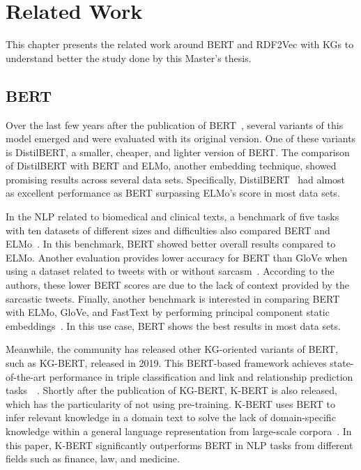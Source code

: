 
\chapter{Related Work}
\label{chap:related:work}

This chapter presents the related work around BERT and RDF2Vec with KGs to
understand better the study done by this Master's thesis.

\section{BERT}
\label{section:related:work:bert}

Over the last few years after the publication of
BERT~\citep{inproceedings:devlin}, several variants of this model emerged and
were evaluated with its original version. One of these variants is DistilBERT, a
smaller, cheaper, and lighter version of BERT. The comparison of DistilBERT with
BERT and ELMo, another embedding technique, showed promising results across
several data sets. Specifically, DistilBERT~\citep{distilbert} had almost as
excellent performance as BERT surpassing ELMo's score in most data sets.

In the NLP related to biomedical and clinical texts, a benchmark of five tasks
with ten datasets of different sizes and difficulties also compared BERT and
ELMo~\citep{peng}. In this benchmark, BERT showed better overall results
compared to ELMo. Another evaluation provides lower accuracy for BERT than GloVe
when using a dataset related to tweets with or without
sarcasm~\citep{khatri}. According to the authors, these lower BERT scores are
due to the lack of context provided by the sarcastic tweets. Finally, another
benchmark is interested in comparing BERT with ELMo, GloVe, and FastText by
performing principal component static embeddings~\citep{ethayarajh}. In this use
case, BERT shows the best results in most data sets.

Meanwhile, the community has released other KG-oriented variants of BERT, such
as KG-BERT, released in 2019. This BERT-based framework achieves
state-of-the-art performance in triple classification and link and relationship
prediction tasks~~\citep{DBLP:journals/corr/abs-1909-03193}. Shortly after the
publication of KG-BERT, K-BERT is also released, which has the particularity of
not using pre-training. K-BERT uses BERT to infer relevant knowledge in a domain
text to solve the lack of domain-specific knowledge within a general language
representation from large-scale corpora~\citep{DBLP:conf/aaai/LiuZ0WJD020}. In
this paper, K-BERT significantly outperforms BERT in NLP tasks from different
fields such as finance, law, and medicine.

